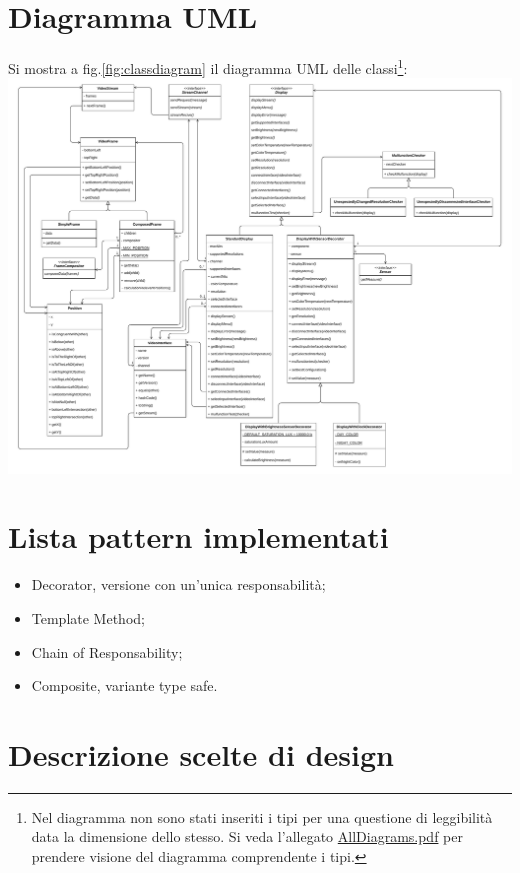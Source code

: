 \documentclass[a4paper,11pt]{article}
\begin{document}
	\section{Diagramma UML}
	Si mostra a fig.\ref{fig:classdiagram} il diagramma UML delle classi\footnote{Nel diagramma non sono stati inseriti i tipi per una questione di leggibilità data la dimensione dello stesso. Si veda l'allegato \href{./diagramma/AllDiagrams.pdf}{AllDiagrams.pdf} per prendere visione del diagramma comprendente i tipi.}:\\
	\noindent\includegraphics[width=\textwidth]{diagramma/ClassDiagramm-NoTypes.pdf}
	\label{fig:classdiagram}
	
	\section{Lista pattern implementati}
	\begin{itemize}
		\item Decorator, versione con un'unica responsabilità;
		\item Template Method;
		\item Chain of Responsability;
		\item Composite, variante type safe.
	\end{itemize}
	
	\section{Descrizione scelte di design}
\end{document}
